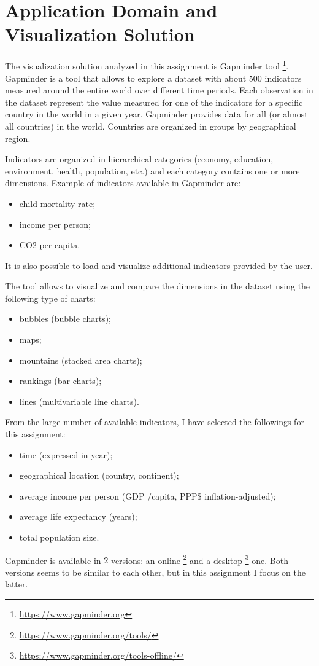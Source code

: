 \section{Application Domain and Visualization Solution}
\label{sec:visualization_solution}

The visualization solution analyzed in this assignment is Gapminder tool \footnote{\url{https://www.gapminder.org}}.
Gapminder is a tool that allows to explore a dataset with about $500$ indicators measured around the entire world over different time periods.
Each observation in the dataset represent the value measured for one of the indicators for a specific country in the world in a given year.
Gapminder provides data for all (or almost all countries) in the world.
Countries are organized in groups by geographical region.

Indicators are organized in hierarchical categories (economy, education, environment, health, population, etc.) and each category contains one or more dimensions.
Example of indicators available in Gapminder are:
\begin{itemize}
    \item child mortality rate;
    \item income per person;
    \item CO2 per capita.
\end{itemize}
It is also possible to load and visualize additional indicators provided by the user.

The tool allows to visualize and compare the dimensions in the dataset using the following type of charts:
\begin{itemize}
    \item bubbles (bubble charts);
    \item maps;
    \item mountains (stacked area charts);
    \item rankings (bar charts);
    \item lines (multivariable line charts).
\end{itemize}

\vspace{5mm}

From the large number of available indicators, I have selected the followings for this assignment:
\begin{itemize}
    \item time (expressed in year);
    \item geographical location (country, continent);
    \item average income per person (GDP /capita, PPP\$ inflation-adjusted);
    \item average life expectancy (years);
    \item total population size.
\end{itemize}

Gapminder is available in $2$ versions: an online \footnote{\url{https://www.gapminder.org/tools/}} and a desktop \footnote{\url{https://www.gapminder.org/tools-offline/}} one.
Both versions seems to be similar to each other, but in this assignment I focus on the latter.
